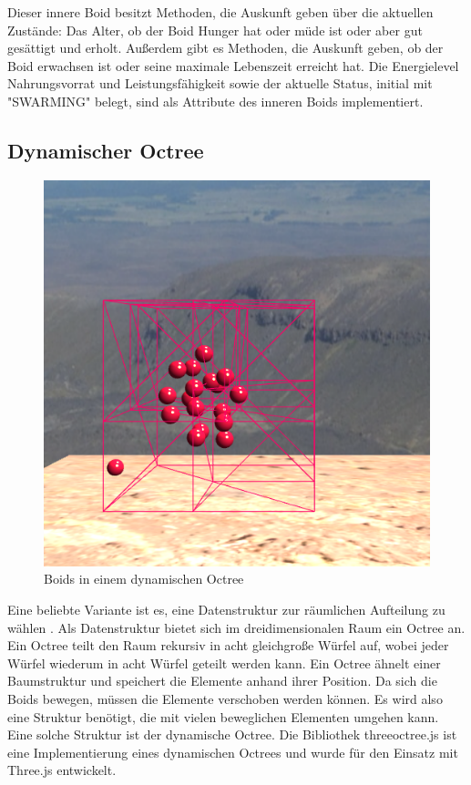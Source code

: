 \documentclass[draft=false
              ,paper=a4
              ,twoside=false
              ,fontsize=11pt
              ,headsepline
              ,BCOR10mm
              ,DIV11
              ,bibtotoc
              ,liststotoc
              ]{scrbook}
\begin{document}
Dieser innere Boid besitzt Methoden, die Auskunft geben über die aktuellen Zustände: Das Alter, ob der Boid Hunger hat oder müde ist oder aber gut gesättigt und erholt. Außerdem gibt es Methoden, die Auskunft geben, ob der Boid erwachsen ist oder seine maximale Lebenszeit erreicht hat. Die Energielevel Nahrungsvorrat und Leistungsfähigkeit sowie der aktuelle Status, initial mit "{}SWARMING"{} belegt, sind als Attribute des inneren Boids implementiert.
\subsection{Dynamischer Octree}

\begin{figure}[!h]
\centering
\includegraphics[scale=0.4]{project/octree.png}
\caption{Boids in einem dynamischen Octree}
\label{octree}
\end{figure}

Eine beliebte Variante ist es, eine Datenstruktur zur räumlichen Aufteilung zu wählen \cite{journals/cie/SilvaLC09}\cite{GPGPUFlock13}\cite{214}.
Als Datenstruktur bietet sich im dreidimensionalen Raum ein Octree an. Ein Octree teilt den Raum rekursiv in acht gleichgroße Würfel auf, wobei jeder Würfel wiederum in acht Würfel geteilt werden kann. Ein Octree ähnelt einer Baumstruktur und speichert die Elemente anhand ihrer Position. Da sich die Boids bewegen, müssen die Elemente verschoben werden können. Es wird also eine Struktur benötigt, die mit vielen beweglichen Elementen umgehen kann. Eine solche Struktur ist der dynamische Octree. Die Bibliothek threeoctree.js ist eine Implementierung eines dynamischen Octrees und wurde für den Einsatz mit Three.js entwickelt.
\end{document}
